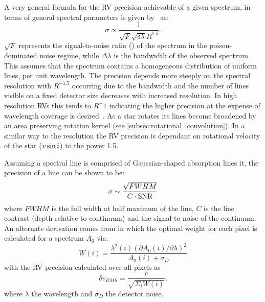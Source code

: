 A very general formula for the RV precision achievable of a given  spectrum, in terms of general spectral parameters is given by~\citet{hatzes_spectrograph_1992} as:
\begin{equation}
\sigma \propto \frac{1}{\sqrt{F} \sqrt{\delta \lambda} R^{1.5}}.
\end{equation}
$\sqrt{F}$ represents the signal-to-noise ratio (\snr{}) of the spectrum in the poison-dominated noise regime, while $\Delta \lambda$ is the bandwidth of the observed spectrum. This assumes that the spectrum contains a homogeneous distribution of uniform lines, per unit wavelength.
The precision depends more steeply on the spectral resolution with $R^{-1.5}$ occurring due  to the bandwidth and the number of lines visible on  a fixed detector size decreases with increased resolution.
In high resolution RVs this tends to $R^-{1}$ indicating the higher precision at the expense of wavelength coverage is desired~\citet{hatzes_spectrograph_1992}.
As a star rotates its lines become broadened by an area preserving rotation kernel (see \cref{subsec:rotational_convolution}).
In a similar way to the resolution the RV precision is dependant on rotational velocity of the star ($v\sin{i}$) to the power 1.5.

Assuming a spectral line is comprised of Gaussian-shaped absorption lines it, the precision of a line can be shown to be:
\begin{equation}
    \sigma \sim \frac{\sqrt{FWHM}}{C \cdot \textrm{SNR}}
\end{equation}
where $FWHM$ is the full width at half maximum of the line, $C$ is the line contrast (depth relative to continuum) and \snr{} the signal-to-noise of the continuum.
An alternate derivation comes from \citet{bouchy_fundamental_2001} in which the optimal weight for each pixel is calculated for a spectrum $A_0$ via:
\begin{equation}
    W(i) = \frac{\lambda^{2}(i) {(\partial A_0(i)/\partial\lambda)}^{2}}{A_0(i) + \sigma_D} \label{eqn:pixel_weigth}
\end{equation}
with the RV precision calculated over all pixels as
\begin{equation}
    \delta v_{RMS} = \frac{c}{\sqrt{\Sigma_i W(i)}}.
\end{equation}
where $\lambda$ the wavelength and $\sigma_D$ the detector noise.


